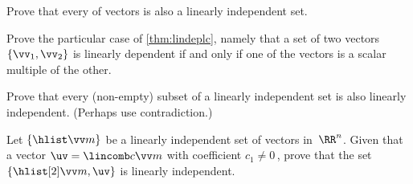 \begin{exercise} 
Prove that every  of vectors is also a linearly independent set.
\end{exercise}




\begin{exercise} \label{ex:lindeplc} 
Prove the particular case of \cref{thm:lindeplc}, namely that a 
set of two vectors \(\{\vv_1,\vv_2\}\) is linearly dependent if and 
only if one of the vectors is a scalar multiple of the other.
\end{exercise}




\begin{exercise}  
Prove that every (non-empty) subset of a linearly independent set is also linearly independent.  (Perhaps use contradiction.)
\end{exercise}





\begin{exercise}  
Let \(\{\hlist\vv m\}\) be a linearly independent set of vectors in~\(\RR^n\).
Given that a vector \(\uv=\lincomb c\vv m\) with coefficient \(c_1\neq0\)\,, prove that the set \(\{\hlist[2]\vv m,\uv\}\) is linearly independent.
\end{exercise}




